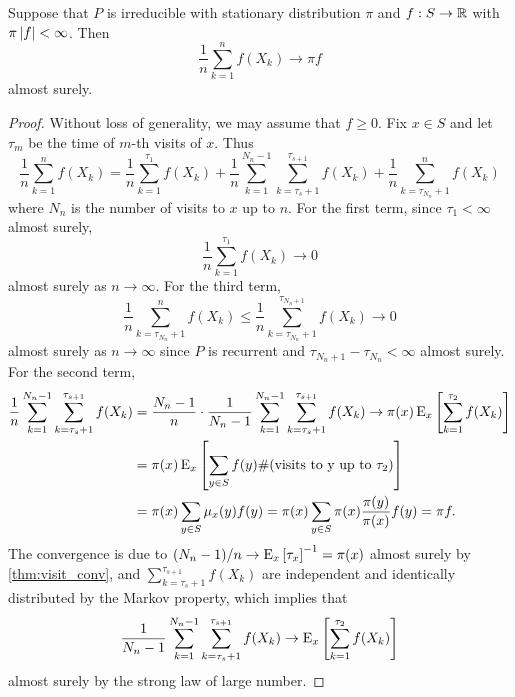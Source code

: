 \begin{theorem}
    Suppose that $P$ is irreducible with stationary distribution $\pi$ and 
    $f:S\to\mathbb{R}$ with $\pi\left\lvert {f} \right\rvert<\infty$. Then 
    \begin{equation*}
        \frac{1}{n}\sum_{k=1}^nf(X_k)\to \pi f 
    \end{equation*} 
    almost surely.
\end{theorem}
\begin{proof}
    Without loss of generality, we may assume that $f\geq 0$. Fix $x\in S$ 
    and let $\tau_m$ be the time of $m$-th visits of $x$. Thus 
    \begin{equation*}
        \frac{1}{n}\sum_{k=1}^n f(X_k) 
        = \frac{1}{n}\sum_{k=1}^{\tau_1}f(X_k) + \frac{1}{n}\sum_{k=1}^{N_n-1}\sum_{k=\tau_s+1}^{\tau_{s+1}}f(X_k) + \frac{1}{n}\sum_{k=\tau_{N_n}+1}^nf(X_k)
    \end{equation*} 
    where $N_n$ is the number of visits to $x$ up to $n$. For the first 
    term, since $\tau_1<\infty$ almost surely, 
    \begin{equation*}
        \frac{1}{n}\sum_{k=1}^{\tau_1}f(X_k)\to 0
    \end{equation*}
    almost surely as $n\to\infty$. For the third term, 
    \begin{equation*}
        \frac{1}{n}\sum_{k=\tau_{N_n}+1}^nf(X_k)\leq \frac{1}{n}\sum_{k=\tau_{N_n}+1}^{\tau_{N_n+1}}f(X_k)\to 0
    \end{equation*}
    almost surely as $n\to\infty$ since $P$ is recurrent and $\tau_{N_n+1}-\tau_{N_n}<\infty$ 
    almost surely. For the second term, 
    \begin{equation*}
        \begin{split}
            \frac{1}{n}\sum_{k=1}^{N_n-1}\sum_{k=\tau_s+1}^{\tau_{s+1}}f(X_k) 
            &= \frac{N_n-1}{n}\cdot \frac{1}{N_n-1}\sum_{k=1}^{N_n-1}\sum_{k=\tau_s+1}^{\tau_{s+1}}f(X_k) 
            \to \pi(x)\operatorname{E}_x\left[ {\sum_{k=1}^{\tau_2}f(X_k)} \right] \\
            &= \pi(x)\operatorname{E}_x\left[ {\sum_{y\in S}f(y)\#(\text{visits to y up to $\tau_2$})} \right] \\
            &= \pi(x)\sum_{y\in S}\mu_x(y)f(y) = \pi(x)\sum_{y\in S}\pi(x)\frac{\pi(y)}{\pi(x)}f(y) = \pi f. 
        \end{split}
    \end{equation*}
    The convergence is due to $(N_n-1)/n\to \operatorname{E}_x\left[ {\tau_x} \right]^{-1} = \pi(x)$ almost surely 
    by \cref{thm:visit_conv}, and $\sum_{k=\tau_s+1}^{\tau_{s+1}}f(X_k)$ are 
    independent and identically distributed by the Markov property, which 
    implies that 
    \begin{equation*}
        \frac{1}{N_n-1}\sum_{k=1}^{N_n-1}\sum_{k=\tau_s+1}^{\tau_{s+1}}f(X_k) 
        \to \operatorname{E}_x\left[ {\sum_{k=1}^{\tau_2}f(X_k)} \right]
    \end{equation*}
    almost surely by the strong law of large number.
\end{proof}


